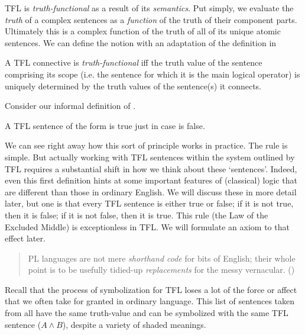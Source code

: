TFL is \emph{truth-functional} as a result of its \emph{semantics}. Put simply,
we evaluate the \emph{truth} of a complex sentences as a \emph{function} of the
truth of their component parts. Ultimately this is a complex function of the
truth of all of its unique atomic sentences. We can define the notion with an
adaptation of the definition in \cite[][p. 72]{Mag25}

\begin{definition}
  \label{def:truth-functional}
  A TFL connective is \emph{truth-functional} iff the truth value of the
  sentence comprising its scope (i.e. the sentence for which it is the main
  logical operator) is uniquely determined by the truth values of the
  sentence(s) it connects.
\end{definition}

Consider our informal definition of \enot\ephi.

\begin{argument}
\item[] A TFL sentence of the form \enot\sphi is true just in case \sphi is
  false. 
\end{argument}

We can see right away how this sort of principle works in practice. The rule is
simple. But actually working with TFL sentences within the system outlined by
TFL requires a substantial shift in how we think about these `sentences'.
Indeed, even this first definition hints at some important features of
(classical) logic that are different than those in ordinary English. We will
discuss these in more detail later, but one is that every TFL sentence is
either true or false; if it is not true, then it is false; if it is not false,
then it is true. This rule (the Law of the Excluded Middle) is exceptionless in
TFL. We will formulate an axiom to that effect later.

\begin{quote}
  PL languages are not mere \emph{shorthand code} for bits of English; their
  whole point is to be usefully tidied-up \emph{replacements} for the messy
  vernacular. (\cite[][p. 83]{Smi20})
\end{quote}

Recall that the process of symbolization for TFL loses a lot of the force or
affect that we often take for granted in ordinary language. This list of
sentences taken from \cite[][p. 73]{Mag25} all have the same truth-value and
can be symbolized with the same TFL sentence ($A \wedge B$), despite a variety
of shaded meanings.


